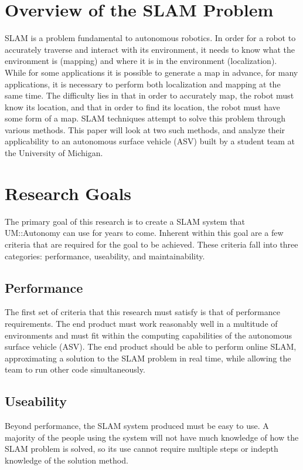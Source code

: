 \documentclass[10pt]{IEEEtran}
\begin{document}
\section{Overview of the SLAM Problem}
SLAM is a problem fundamental to autonomous robotics.  In order for a robot to accurately
traverse and interact with its environment, it needs to know what the environment is 
(mapping) and where it is in the environment (localization).  While for some applications it
is possible to generate a map in advance, for many applications, it is necessary to perform 
both localization and mapping at the same time.  The difficulty lies in that in order to 
accurately map, the robot must know its location, and that in order to find its location, the
robot must have some form of a map.  SLAM techniques attempt to solve this problem through 
various methods.  This paper will look at two such methods, and analyze their applicability
to an autonomous surface vehicle (ASV) built by a student team at the University of Michigan.

\section{Research Goals}
The primary goal of this research is to create a SLAM system that 
UM::Autonomy can use for years to come.  Inherent within this goal are a few criteria that
are required for the goal to be achieved. These criteria fall into three categories:
performance, useability, and maintainability.

\subsection{Performance}
The first set of criteria that this research must satisfy is that of performance
requirements.  The end product must work reasonably well in a multitude of environments and
must fit within the computing capabilities of the autonomous surface vehicle (ASV).
The end product
should be able to perform online SLAM, approximating a solution to the SLAM problem in 
real time, while allowing the team to run other code simultaneously.

\subsection{Useability}
Beyond performance, the SLAM system produced must be easy to use.  A majority of the 
people using the system will not have much knowledge of how the SLAM problem is solved,
so its use cannot require multiple steps or indepth knowledge of the solution method.
\end{document}
